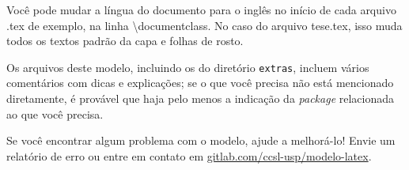 Você pode mudar a língua do documento para o inglês no início de cada
arquivo .tex de exemplo, na linha \textsf{\textbackslash{}documentclass}.
No caso do arquivo \textsf{tese.tex}, isso muda todos os textos padrão
da capa e folhas de rosto.

Os arquivos deste modelo, incluindo os do diretório \texttt{extras},
incluem vários comentários com dicas e explicações; se o que você precisa
não está mencionado diretamente, é provável que haja pelo menos a indicação
da \textit{package} relacionada ao que você precisa.

Se você encontrar algum problema com o modelo, ajude a melhorá-lo!
Envie um relatório de erro ou entre em contato em
\url{gitlab.com/ccsl-usp/modelo-latex}.
